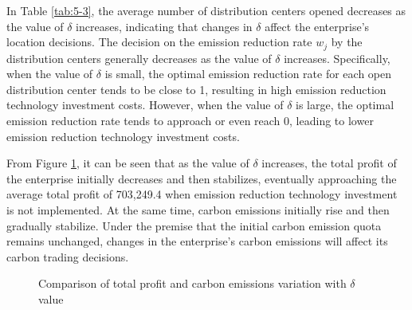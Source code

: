 \documentclass[]{article}
\theoremstyle{plain}%
\theoremstyle{definition}
\theoremstyle{remark}
\theoremstyle{plain}%
\begin{document}
In Table \ref{tab:5-3}, the average number of distribution centers opened decreases as the value of $\delta$ increases, indicating that changes in $\delta$ affect the enterprise's location decisions. The decision on the emission reduction rate $w_j$ by the distribution centers generally decreases as the value of $\delta$ increases. Specifically, when the value of $\delta$ is small, the optimal emission reduction rate for each open distribution center tends to be close to 1, resulting in high emission reduction technology investment costs. However, when the value of $\delta$ is large, the optimal emission reduction rate tends to approach or even reach 0, leading to lower emission reduction technology investment costs.     

From Figure \ref{fig:5-3}, it can be seen that as the value of $\delta$ increases, the total profit of the enterprise initially decreases and then stabilizes, eventually approaching the average total profit of 703,249.4 when emission reduction technology investment is not implemented. At the same time, carbon emissions initially rise and then gradually stabilize. Under the premise that the initial carbon emission quota remains unchanged, changes in the enterprise's carbon emissions will affect its carbon trading decisions. 


\begin{figure}[H]
    \centering
    \caption{Comparison of total profit and carbon emissions variation with $\delta$ value}
    \label{fig:5-3}
    \end{figure}
\end{document}
